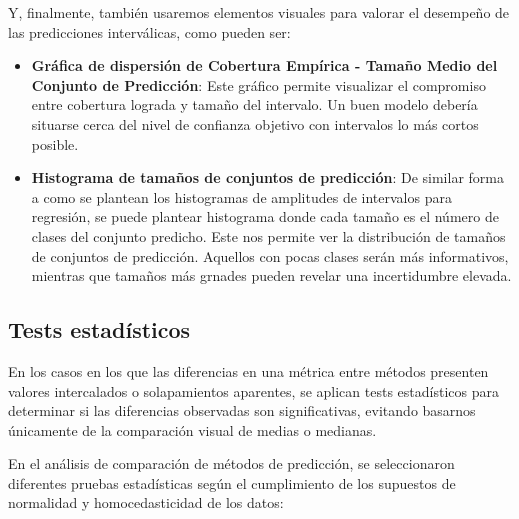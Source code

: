 Y, finalmente, también usaremos elementos visuales para valorar el desempeño de las predicciones interválicas, como pueden ser:

\begin{itemize}

    \item \textbf{Gráfica de dispersión de Cobertura Empírica - Tamaño Medio del Conjunto de Predicción}: Este gráfico permite visualizar el compromiso entre cobertura lograda y tamaño del intervalo. Un buen modelo debería situarse cerca del nivel de confianza objetivo con intervalos lo más cortos posible. 

    \item \textbf{Histograma de tamaños de conjuntos de predicción}: De similar forma a como se plantean los histogramas de amplitudes de intervalos para regresión, se puede plantear histograma donde cada tamaño es el número de clases del conjunto predicho. Este nos permite ver la distribución de tamaños de conjuntos de predicción. Aquellos con pocas clases serán más informativos, mientras que tamaños más grnades pueden revelar una incertidumbre elevada.
    
\end{itemize}


\subsection{Tests estadísticos}

En los casos en los que las diferencias en una métrica entre métodos presenten valores intercalados o solapamientos aparentes, se aplican tests estadísticos para determinar si las diferencias observadas son significativas, evitando basarnos únicamente de la comparación visual de medias o medianas.

En el análisis de comparación de métodos de predicción, se seleccionaron diferentes pruebas estadísticas según el cumplimiento de los supuestos de normalidad y homocedasticidad de los datos:

